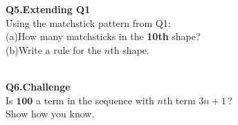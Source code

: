 \documentclass{beamer}
\newcommand{\ashow}[1]{\uncover<2->{\textcolor{red}{\small #1}}}
\begin{document}
\begin{frame}
  \begin{minipage}[t]{0.48\textwidth}
    \small\textbf{Q5.\enspace Extending Q1}\\
    \footnotesize
    Using the matchstick pattern from Q1:\\
    (a)\;How many matchsticks in the \textbf{10th} shape?\\
    (b)\;Write a rule for the $n$th shape.\\[0.2em]
    \ashow{(a)\;31 matchsticks.}\\
    \ashow{(b)\;position-to-term rule:\;$3n+1$}
  \end{minipage}\hfill
  \begin{minipage}[t]{0.48\textwidth}
    \small\textbf{Q6.\;Challenge}\\
    \footnotesize
    Is $\boldsymbol{100}$ a term in the sequence
    with $n$th term $3n+1$\,?\\
    Show how you know.\\[0.2em]
    \ashow{Yes, when $n=33$,}\\
    \ashow{$3n+1=3\times33+1=99+1=100$}
  \end{minipage}

\end{frame}
\end{document}
